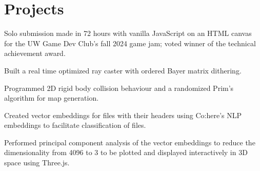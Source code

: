 \section{Projects}

\begin{resumeItem}
\begin{resumeList}
    \item Solo submission made in 72 hours with vanilla JavaScript on an HTML canvas for the UW Game Dev Club's fall 2024 game jam; voted winner of the technical achievement award.
    \item Built a real time optimized ray caster with ordered Bayer matrix dithering.
    \item Programmed 2D rigid body collision behaviour and a randomized Prim's algorithm for map generation.
\end{resumeList}
\end{resumeItem}


\begin{resumeItem}
\begin{resumeList}
    \item Created vector embeddings for files with their headers using Co:here's NLP embeddings to facilitate classification of files.
    \item Performed principal component analysis of the vector embeddings to reduce the dimensionality from 4096 to 3 to be plotted and displayed interactively in 3D space using Three.js.
\end{resumeList}
\end{resumeItem}

